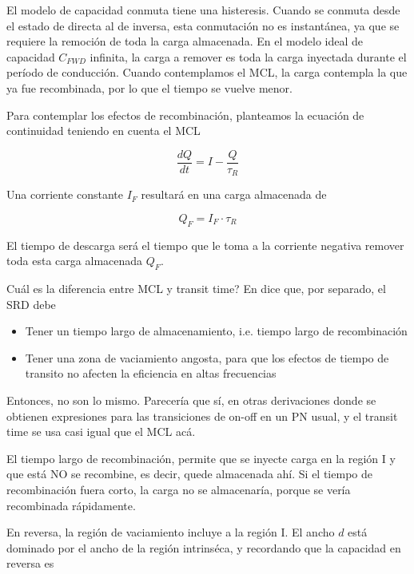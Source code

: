 El modelo de capacidad conmuta tiene una histeresis. Cuando se conmuta desde el
estado de directa al de inversa, esta conmutación no es instantánea, ya que se
requiere la remoción de toda la carga almacenada. En el modelo ideal de
capacidad $C_{FWD}$ infinita, la carga a remover es toda la carga inyectada
durante el período de conducción. Cuando contemplamos el MCL, la carga contempla
la que ya fue recombinada, por lo que el tiempo se vuelve menor.

Para contemplar los efectos de recombinación, planteamos la ecuación de
continuidad teniendo en cuenta el MCL

\begin{equation}
    \frac{dQ}{dt} = I-\frac{Q}{\tau_R}
\end{equation}

Una corriente constante $I_F$ resultará en una carga almacenada de

\begin{equation}
    Q_F = I_F \cdot \tau_R
\end{equation}

El tiempo de descarga será el tiempo que le toma a la corriente negativa remover
toda esta carga almacenada $Q_F$.

Cuál es la diferencia entre MCL y transit time? En \cite{maas2003} dice que, por
separado, el SRD debe

\begin{itemize}
    \item Tener un tiempo largo de almacenamiento, i.e. tiempo largo de
        recombinación
    \item Tener una zona de vaciamiento angosta, para que los efectos de tiempo
        de transito no afecten la eficiencia en altas frecuencias
\end{itemize}

Entonces, no son lo mismo. Parecería que sí, en otras derivaciones donde se
obtienen expresiones para las transiciones de on-off en un PN usual, y el
transit time se usa casi igual que el MCL acá.

El tiempo largo de recombinación, permite que se inyecte carga en la región I y
que está NO se recombine, es decir, quede almacenada ahí. Si el tiempo de
recombinación fuera corto, la carga no se almacenaría, porque se vería
recombinada rápidamente.

En reversa, la región de vaciamiento incluye a la región I. El ancho $d$ está
dominado por el ancho de la región intrinséca, y recordando que la capacidad en
reversa es

